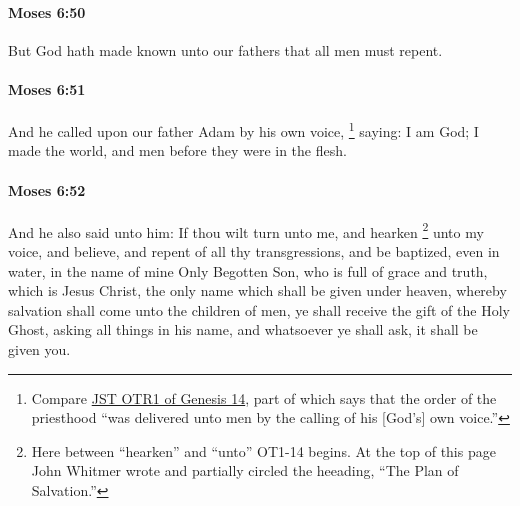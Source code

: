 		\paragraph{Moses 6:50} %
			\label{MOSES-6-50}

			But God hath made known unto our fathers that all men must repent.


		\paragraph{Moses 6:51} %
			\label{MOSES-6-51}

			And he called upon our father Adam by his own voice,%
				\footnote{%
					Compare \hyperlink{JST-OTR1-GENESIS-14-d}{JST OTR1 of Genesis 14}, part of which says that the order of the priesthood ``was delivered unto men by the calling of his [God's] own voice.'' 
					}
			saying: I am God; I made the world, and men before they were in the flesh.


		\paragraph{Moses 6:52} %
			\label{MOSES-6-52}

			And he also said unto him: If thou wilt turn unto me, and hearken%
				\footnote{%
					Here between ``hearken'' and ``unto'' OT1-14 begins. At the top of this page John Whitmer wrote and partially circled the heeading, ``The Plan of Salvation.''
					}
			unto my voice, and believe, and repent of all thy transgressions, and be baptized, even in water, in the name of mine Only Begotten Son, who is full of grace and truth, which is Jesus Christ, the only name which shall be given under heaven, whereby salvation shall come unto the children of men, ye shall receive the gift of the Holy Ghost, asking all things in his name, and whatsoever ye shall ask, it shall be given you.

